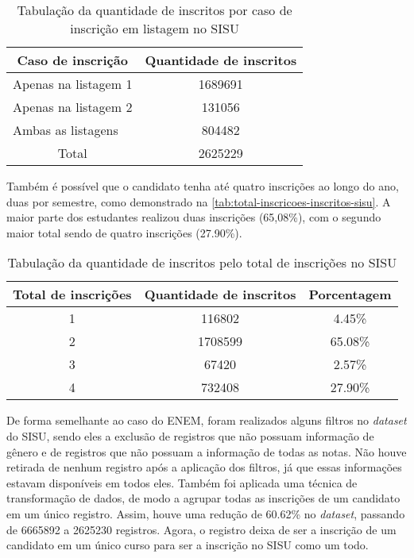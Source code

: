 \begin{table}[h]
  \begin{tabular}{lc}
  \hline
  \multicolumn{1}{c}{\textbf{Caso de inscrição}}        & \textbf{Quantidade de inscritos} \\ \hline
  Apenas na listagem 1  & 1689691                          \\ \hline
  Apenas na listagem 2  & 131056                           \\ \hline
  Ambas as listagens & 804482                           \\ \hline
  \multicolumn{1}{c}{Total}                & 2625229                          \\ \hline
  \end{tabular}
  \caption{Tabulação da quantidade de inscritos por caso de inscrição em listagem no SISU}
  \label{tab:caso-inscricao-sisu}
  \end{table}

Também é possível que o candidato tenha até quatro inscrições ao longo do ano, duas por semestre, como demonstrado na \autoref{tab:total-inscricoes-inscritos-sisu}. A maior parte dos estudantes realizou duas inscrições (65,08\%), com o segundo maior total sendo de quatro inscrições (27.90\%).

\begin{table}[h]
  \begin{tabular}{ccc}
  \hline
  \textbf{Total de inscrições} & \textbf{Quantidade de inscritos} & \textbf{Porcentagem} \\ \hline
  1                            & 116802                           & 4.45\%               \\ \hline
  2                            & 1708599                          & 65.08\%              \\ \hline
  3                            & 67420                            & 2.57\%               \\ \hline
  4                            & 732408                           & 27.90\%              \\ \hline
  \end{tabular}
  \caption{Tabulação da quantidade de inscritos pelo total de inscrições no SISU}
  \label{tab:total-inscricoes-inscritos-sisu}
  \end{table}

De forma semelhante ao caso do ENEM, foram realizados alguns filtros no \textit{dataset} do SISU, sendo eles a exclusão de registros que não possuam informação de gênero e de registros que não possuam a informação de todas as notas. Não houve retirada de nenhum registro após a aplicação dos filtros, já que essas informações estavam disponíveis em todos eles. Também foi aplicada uma técnica de transformação de dados, de modo a agrupar todas as inscrições de um candidato em um único registro. Assim, houve uma redução de 60.62\% no \textit{dataset}, passando de 6665892 a 2625230 registros. Agora, o registro deixa de ser a inscrição de um candidato em um único curso para ser a inscrição no SISU como um todo.

